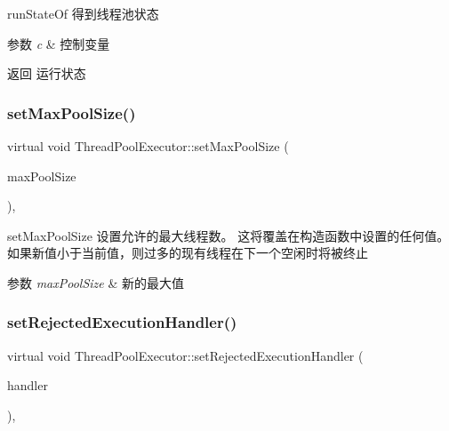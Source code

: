 run\+State\+Of 得到线程池状态 


\begin{DoxyParams}{参数}
{\em c} & 控制变量\\
\hline
\end{DoxyParams}
\begin{DoxyReturn}{返回}
运行状态 
\end{DoxyReturn}
\mbox{\label{classThreadPoolExecutor_ac5a10d336958ca43530b31bff81c9c4b}} 
\subsubsection{\texorpdfstring{set\+Max\+Pool\+Size()}{setMaxPoolSize()}}
{\footnotesize\ttfamily virtual void Thread\+Pool\+Executor\+::set\+Max\+Pool\+Size (\begin{DoxyParamCaption}\item[{int}]{max\+Pool\+Size }\end{DoxyParamCaption})\hspace{0.3cm}{\ttfamily [final]}, {\ttfamily [virtual]}}



set\+Max\+Pool\+Size 设置允许的最大线程数。 这将覆盖在构造函数中设置的任何值。 如果新值小于当前值，则过多的现有线程在下一个空闲时将被终止 


\begin{DoxyParams}{参数}
{\em max\+Pool\+Size} & 新的最大值 \\
\hline
\end{DoxyParams}
\mbox{\label{classThreadPoolExecutor_a0a471dc0a68b70d99d8215565a4df688}} 
\subsubsection{\texorpdfstring{set\+Rejected\+Execution\+Handler()}{setRejectedExecutionHandler()}}
{\footnotesize\ttfamily virtual void Thread\+Pool\+Executor\+::set\+Rejected\+Execution\+Handler (\begin{DoxyParamCaption}\item[{\hyperlink{classRejectedExecutionHandler}{Rejected\+Execution\+Handler}}]{handler }\end{DoxyParamCaption})\hspace{0.3cm}{\ttfamily [final]}, {\ttfamily [virtual]}}



